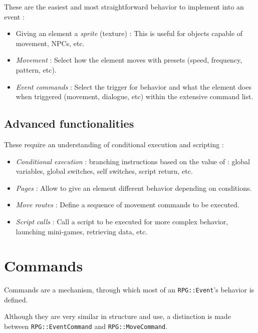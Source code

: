 \documentclass[11pt]{article}
\begin{document}
These are the easiest and most straightforward behavior to implement into an event :

\begin{itemize}
	\item Giving an element a \textit{sprite} (texture) : This is useful for objects capable of movement, NPCs, etc.
	
	\item \textit{Movement} : Select how the element moves with presets (speed, frequency, pattern, etc).
	
	\item \textit{Event commands} : Select the trigger for behavior and what the element does when triggered (movement, dialogue, etc) within the extensive command list.
\end{itemize}

\subsection{Advanced functionalities}

These require an understanding of conditional execution and scripting :

\begin{itemize}
	\item \textit{Conditional execution} : branching instructions based on the value of : global variables, global switches, self switches, script return, etc.
	
	\item \textit{Pages} : Allow to give an element different behavior depending on conditions.
	
	\item \textit{Move routes} : Define a sequence of movement commands to be executed.
	
	\item \textit{Script calls} : Call a script to be executed for more complex behavior, launching mini-games, retrieving data, etc.
\end{itemize}



\newpage
\section{Commands}

Commands are a mechanism, through which most of an \verb|RPG::Event|'s behavior is defined.

Although they are very similar in structure and use, a distinction is made between \verb|RPG::EventCommand| and \verb|RPG::MoveCommand|.
\end{document}
